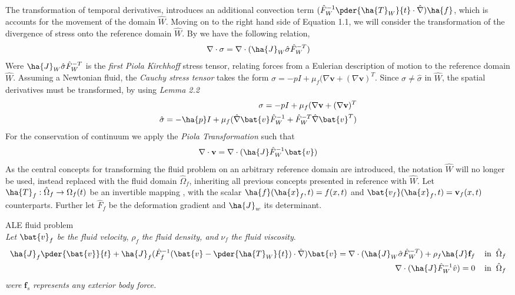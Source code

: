 The transformation of temporal derivatives, introduces an additional convection term 
$ (\hat{F}_W^{-1} \pder{\ha{T}_W}{t} \cdot \hat{\nabla}) \ha{f}$, which is accounts for the movement of the domain $\hat{W}$. 
Moving on to the right hand side of Equation 1.1, we will consider the transformation of the divergence of stress onto the reference domain $\hat{W}$. By \cite{Richter2016} we have the following relation,
\begin{align}
\nabla \cdot \sigma = \nabla \cdot (\ha{J}_W \hat{\sigma}\hat{F}_W^{-T})
\end{align}
Were $\ha{J}_W \hat{\sigma}\hat{F}_W^{-T}$ is the \textit{first Piola Kirchhoff} stress tensor, relating forces from a Eulerian description of motion to the reference domain $\hat{W}$.
Assuming a Newtonian fluid, the \textit{Cauchy stress tensor} takes the form $\sigma = -p I + \mu_f(\nabla \mathbf{v} + (\nabla \mathbf{v})^T$. Since $\sigma \neq \hat{\sigma}$ in $\hat{W}$, the spatial derivatives must be transformed, by using \textit{Lemma 2.2}
\begin{align*}
\sigma = -p I + \mu_f(\nabla \mathbf{v} + (\nabla \mathbf{v})^T \\
\hat{\sigma} = -\ha{p} I + \mu_f(\hat{\nabla}\bat{v}\hat{F}_W^{-1} +\hat{F}_W^{-T}\hat{\nabla}\bat{v}^T )
\end{align*} 
For the conservation of continuum we apply the \textit{Piola Transformation} \cite{Richter2016}such that
\begin{align}
\nabla \cdot \mathbf{v} = \nabla \cdot (\ha{J} \hat{F}_W^{-1} \bat{v})
\end{align}
As the central concepts for transforming the fluid problem on an arbitrary reference domain are introduced, the notation $\hat{W}$ will no longer be used, instead replaced with the fluid domain $\hat{\Omega}_f$, inheriting all previous concepts presented in reference with $\hat{W}$.
 Let $\ha{T}_f : \hat{\Omega}_f \rightarrow \Omega_f (t)$ be an  invertible mapping , with the scalar $\ha{f}(\ha{x}_f, t) = f(x,t) $ and $\bat{v_f}(\ha{x}_f, t) = \mathbf{v}_f (x,t) $ counterparts. Further let $\hat{F}_f$ be the deformation gradient and  $\ha{J}_w$ its determinant.
\begin{equat}
ALE fluid problem \\ 
\textit{Let } $\bat{v}_f$ \textit{be the fluid velocity}, $\rho_f$  \textit{the fluid density, and }  $\nu_f$  \textit{the fluid viscosity}.
\begin{align}
\ha{J}_f \pder{\bat{v}}{t} + \ha{J}_f (\hat{F}_f^{-1}(\bat{v} - \pder{\ha{T}_W}{t}) \cdot \hat{\nabla}) \bat{v}
= \nabla \cdot (\ha{J}_W \hat{\sigma}\hat{F}_W^{-T}) + \rho_f \ha{J} \mathbf{f}_f
\hspace{4mm} \text{in} \hspace{2mm} \hat{\Omega}_f \\
\nabla \cdot (\ha{J} \hat{F}_W^{-1} \hat{v}) = 0 \hspace{4mm} \text{in} \hspace{2mm} \hat{\Omega}_f 
\end{align}
\textit{were}  $\mathbf{f}_s$  \textit{represents any exterior body force.}
\end{equat}
